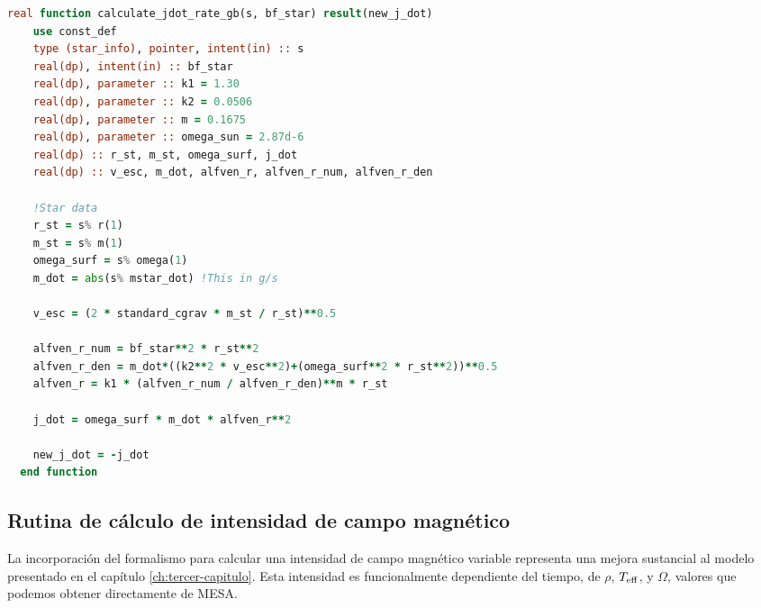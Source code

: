\begin{lstlisting}[language=Fortran, float, caption={Rutina de par de torsión para un campo magnético de intensidad variable.}, label={lst:jdot_gb}]
  real function calculate_jdot_rate_gb(s, bf_star) result(new_j_dot)
	use const_def
	type (star_info), pointer, intent(in) :: s
	real(dp), intent(in) :: bf_star
	real(dp), parameter :: k1 = 1.30
	real(dp), parameter :: k2 = 0.0506
	real(dp), parameter :: m = 0.1675
	real(dp), parameter :: omega_sun = 2.87d-6
	real(dp) :: r_st, m_st, omega_surf, j_dot
	real(dp) :: v_esc, m_dot, alfven_r, alfven_r_num, alfven_r_den
	
	!Star data
	r_st = s% r(1)
	m_st = s% m(1)
	omega_surf = s% omega(1)
	m_dot = abs(s% mstar_dot) !This in g/s
	
	v_esc = (2 * standard_cgrav * m_st / r_st)**0.5
	
	alfven_r_num = bf_star**2 * r_st**2
	alfven_r_den = m_dot*((k2**2 * v_esc**2)+(omega_surf**2 * r_st**2))**0.5
	alfven_r = k1 * (alfven_r_num / alfven_r_den)**m * r_st
	
	j_dot = omega_surf * m_dot * alfven_r**2
	
	new_j_dot = -j_dot
  end function	
\end{lstlisting}

\subsection{Rutina de cálculo de intensidad de campo magnético}
La incorporación del formalismo para calcular una intensidad de campo magnético variable representa una mejora sustancial al modelo presentado en el capítulo \ref{ch:tercer-capitulo}. Esta intensidad es funcionalmente dependiente del tiempo, de $\rho$, $T_{\mathrm{eff}}$, y $\Omega$, valores que podemos obtener directamente de MESA.\par

